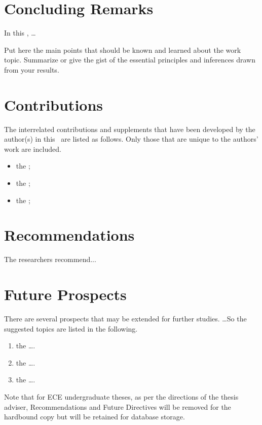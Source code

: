 \section{Concluding Remarks}

In this \documentType, \ldots

Put here the main points that should be known and learned about the  work topic. Summarize or give the gist of the essential principles and inferences drawn from your results.

\section{Contributions}

The interrelated  contributions and supplements that have been developed by the author(s) in this \documentType \ are listed as follows.  Only those that are unique to the authors' work are included.

\begin{itemize}
  \item the ; 
	
	\item the ; 
  
  \item the ; 
	
\end{itemize}


\section{Recommendations}

The researchers recommend...

\section{Future Prospects}

There are several prospects that may be extended for further studies. \ldots So the suggested topics are listed in the following.

\begin{enumerate}
	\item  the \ldots.
	
	\item  the \ldots.
		
	\item  the \ldots.
\end{enumerate}

Note that for ECE undergraduate theses, as per the directions of the thesis adviser, Recommendations and Future Directives will be removed for the hardbound copy but will be retained for database storage.

